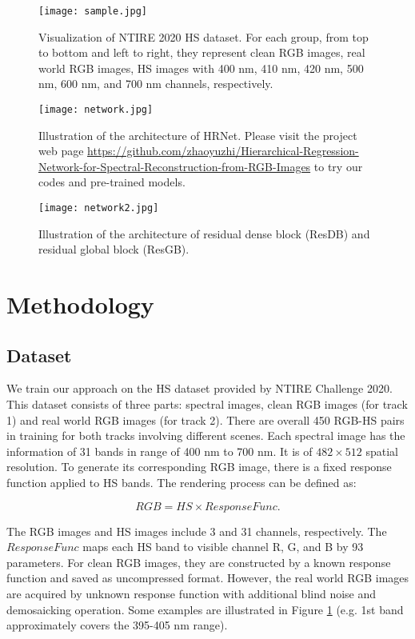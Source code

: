 \documentclass[10pt,twocolumn,letterpaper]{article}
\begin{document}
\begin{figure}[htbp]
\centering
\texttt{[image: sample.jpg]}
\caption{Visualization of NTIRE 2020 HS dataset. For each group, from top to bottom and left to right, they represent clean RGB images, real world RGB images, HS images with 400 nm, 410 nm, 420 nm, 500 nm, 600 nm, and 700 nm channels, respectively.}
\label{sample}
\end{figure}

\begin{figure*}[t]
\centering
\texttt{[image: network.jpg]}
\caption{Illustration of the architecture of HRNet. Please visit the project web page \url{https://github.com/zhaoyuzhi/Hierarchical-Regression-Network-for-Spectral-Reconstruction-from-RGB-Images} to try our codes and pre-trained models.}
\label{network}
\end{figure*}

\begin{figure}[htbp]
\centering
\texttt{[image: network2.jpg]}
\caption{Illustration of the architecture of residual dense block (ResDB) and residual global block (ResGB).}
\label{network2}
\end{figure}

\section{Methodology}

\subsection{Dataset}

We train our approach on the HS dataset provided by NTIRE Challenge 2020. This dataset consists of three parts: spectral images, clean RGB images (for track 1) and real world RGB images (for track 2). There are overall 450 RGB-HS pairs in training for both tracks involving different scenes. Each spectral image has the information of 31 bands in range of 400 nm to 700 nm. It is of $482 \times 512$ spatial resolution. To generate its corresponding RGB image, there is a fixed response function applied to HS bands. The rendering process can be defined as:

\begin{equation}
RGB = HS \times ResponseFunc.
\label{equ2}
\end{equation}

The RGB images and HS images include 3 and 31 channels, respectively. The $ResponseFunc$ maps each HS band to visible channel R, G, and B by 93 parameters. For clean RGB images, they are constructed by a known response function and saved as uncompressed format. However, the real world RGB images are acquired by unknown response function with additional blind noise and demosaicking operation. Some examples are illustrated in Figure \ref{sample} (e.g. 1st band approximately covers the 395-405 nm range).
\end{document}
